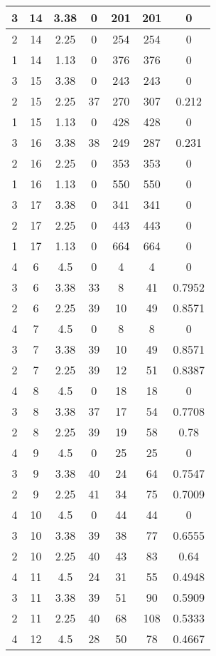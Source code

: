 \documentclass[letterpaper, 12pt]{article}
\begin{document}
\begin{longtable}{|c|c|c|c|c|c|c|}
\hline
3 & 14 & 3.38 & 0 & 201 & 201 & 0 \\
\hline
2 & 14 & 2.25 & 0 & 254 & 254 & 0 \\
\hline
1 & 14 & 1.13 & 0 & 376 & 376 & 0 \\
\hline
3 & 15 & 3.38 & 0 & 243 & 243 & 0 \\
\hline
2 & 15 & 2.25 & 37 & 270 & 307 & 0.212 \\
\hline
1 & 15 & 1.13 & 0 & 428 & 428 & 0 \\
\hline
3 & 16 & 3.38 & 38 & 249 & 287 & 0.231 \\
\hline
2 & 16 & 2.25 & 0 & 353 & 353 & 0 \\
\hline
1 & 16 & 1.13 & 0 & 550 & 550 & 0 \\
\hline
3 & 17 & 3.38 & 0 & 341 & 341 & 0 \\
\hline
2 & 17 & 2.25 & 0 & 443 & 443 & 0 \\
\hline
1 & 17 & 1.13 & 0 & 664 & 664 & 0 \\
\hline
4 & 6 & 4.5 & 0 & 4 & 4 & 0 \\
\hline
3 & 6 & 3.38 & 33 & 8 & 41 & 0.7952 \\
\hline
2 & 6 & 2.25 & 39 & 10 & 49 & 0.8571 \\
\hline
4 & 7 & 4.5 & 0 & 8 & 8 & 0 \\
\hline
3 & 7 & 3.38 & 39 & 10 & 49 & 0.8571 \\
\hline
2 & 7 & 2.25 & 39 & 12 & 51 & 0.8387 \\
\hline
4 & 8 & 4.5 & 0 & 18 & 18 & 0 \\
\hline
3 & 8 & 3.38 & 37 & 17 & 54 & 0.7708 \\
\hline
2 & 8 & 2.25 & 39 & 19 & 58 & 0.78 \\
\hline
4 & 9 & 4.5 & 0 & 25 & 25 & 0 \\
\hline
3 & 9 & 3.38 & 40 & 24 & 64 & 0.7547 \\
\hline
2 & 9 & 2.25 & 41 & 34 & 75 & 0.7009 \\
\hline
4 & 10 & 4.5 & 0 & 44 & 44 & 0 \\
\hline
3 & 10 & 3.38 & 39 & 38 & 77 & 0.6555 \\
\hline
2 & 10 & 2.25 & 40 & 43 & 83 & 0.64 \\
\hline
4 & 11 & 4.5 & 24 & 31 & 55 & 0.4948 \\
\hline
3 & 11 & 3.38 & 39 & 51 & 90 & 0.5909 \\
\hline
2 & 11 & 2.25 & 40 & 68 & 108 & 0.5333 \\
\hline
4 & 12 & 4.5 & 28 & 50 & 78 & 0.4667 \\

\end{longtable}
\end{document}
